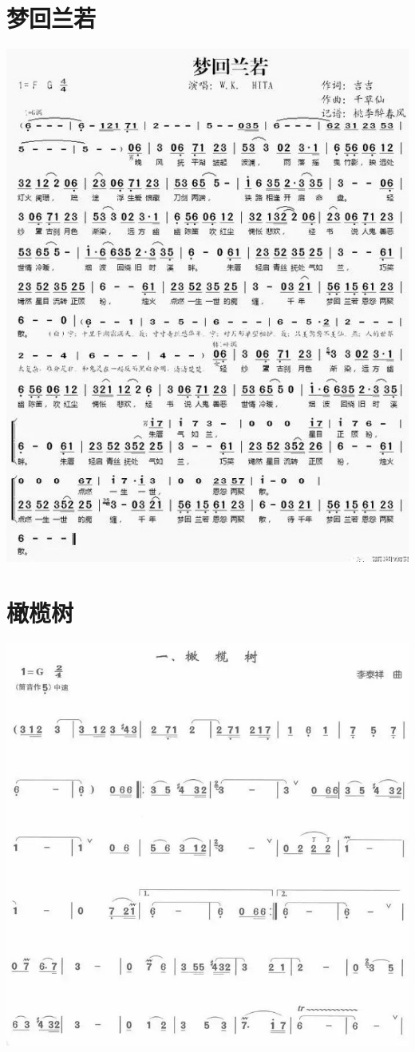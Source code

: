 \documentclass[cn,pad,twocol]{elegantbook}
\begin{document}
\section{梦回兰若}\includegraphics[width=\textwidth]{dongxiao/20200819/梦回兰若.jpeg}
\section{橄榄树}\includegraphics[width=\textwidth]{dongxiao/20200819/橄榄树.jpeg}
\end{document}
